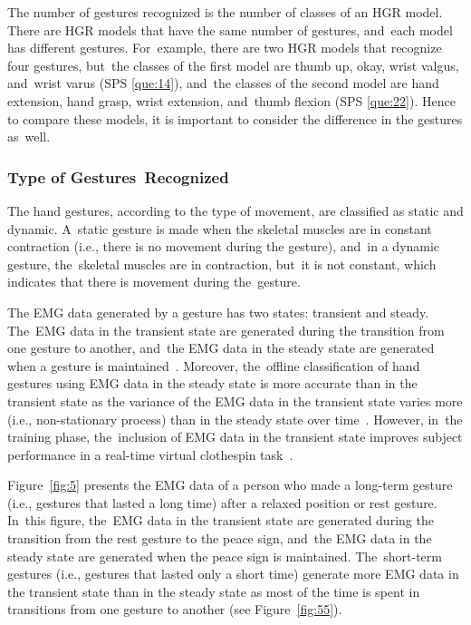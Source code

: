\documentclass[sensors,review,accept,moreauthors,pdftex]{Definitions/mdpi}
\begin{document}
The number of gestures recognized is the number of classes of an HGR model. There are HGR models that have the same number of gestures, and~each model has different gestures. For~example, there are two HGR models that recognize four gestures, but~the classes of the first model are thumb up, okay, wrist valgus, and~wrist varus (SPS \ref{que:14}), and~the classes of the second model are hand extension, hand grasp, wrist extension, and~thumb flexion (SPS \ref{que:22}). Hence to compare these models, it is important to consider the difference in the gestures as~well.

\subsubsection{Type of Gestures~Recognized } \label{gesture}

The hand gestures, according to the type of movement, are classified as static and dynamic. A~static gesture is made when the skeletal muscles are in constant contraction (i.e., there is no movement during the gesture), and~in a dynamic gesture, the~skeletal muscles are in contraction, but~it is not constant, which indicates that there is movement during the~gesture.








The EMG data generated by a gesture has two states: transient and steady. The~EMG data in the transient state are generated during the transition from one gesture to another, and~the EMG data in the steady state are generated when a gesture is maintained~\cite{hudgins1993new}. Moreover, the~offline classification of hand gestures using EMG data in the steady state is more accurate than in the transient state as the variance of the EMG data in the transient state varies more (i.e., non-stationary process) than in the steady state over time~\cite{Englehart2001}. However, in~the training phase, the~inclusion of EMG data in the transient state improves subject performance in a real-time virtual clothespin task~\cite{hargrove2007real,gusman2017evaluation}. 

Figure~\ref{fig:5} presents the EMG data of a person who made a long-term gesture (i.e., gestures that lasted a long time) after a relaxed position or rest gesture. In~this figure, the~EMG data in the transient state are generated during the transition from the rest gesture to the peace sign, and~the EMG data in the steady state are generated when the peace sign is maintained. The~short-term gestures (i.e., gestures that lasted only a short time) generate more EMG data in the transient state than in the steady state as most of the time is spent in transitions from one gesture to another (see Figure~\ref{fig:55}).  
\end{document}
